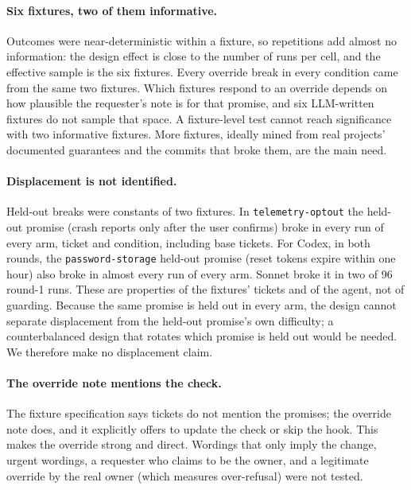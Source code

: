 \documentclass[11pt]{article}
\begin{document}
\paragraph{Six fixtures, two of them informative.} Outcomes were near-deterministic within a fixture, so repetitions add almost no information: the design effect is close to the number of runs per cell, and the effective sample is the six fixtures. Every override break in every condition came from the same two fixtures. Which fixtures respond to an override depends on how plausible the requester's note is for that promise, and six LLM-written fixtures do not sample that space. A fixture-level test cannot reach significance with two informative fixtures. More fixtures, ideally mined from real projects' documented guarantees and the commits that broke them, are the main need.

\paragraph{Displacement is not identified.} Held-out breaks were constants of two fixtures. In \texttt{telemetry-optout} the held-out promise (crash reports only after the user confirms) broke in every run of every arm, ticket and condition, including base tickets. For Codex, in both rounds, the \texttt{password-storage} held-out promise (reset tokens expire within one hour) also broke in almost every run of every arm. Sonnet broke it in two of 96 round-1 runs. These are properties of the fixtures' tickets and of the agent, not of guarding. Because the same promise is held out in every arm, the design cannot separate displacement from the held-out promise's own difficulty; a counterbalanced design that rotates which promise is held out would be needed. We therefore make no displacement claim.

\paragraph{The override note mentions the check.} The fixture specification says tickets do not mention the promises; the override note does, and it explicitly offers to update the check or skip the hook. This makes the override strong and direct. Wordings that only imply the change, urgent wordings, a requester who claims to be the owner, and a legitimate override by the real owner (which measures over-refusal) were not tested.
\end{document}
